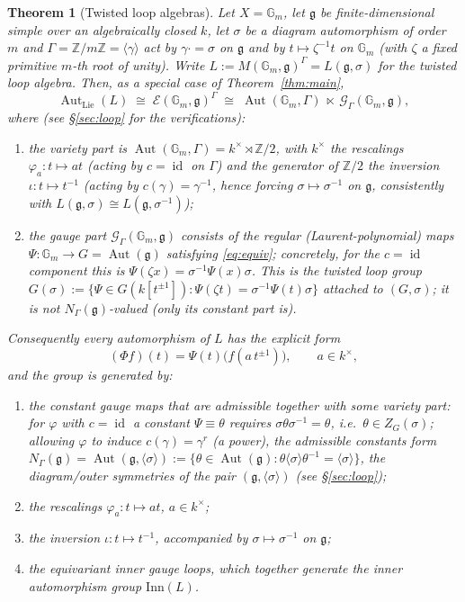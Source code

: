 \documentclass{amsart}
\newtheorem{theorem}{Theorem}
\theoremstyle{definition}
\DeclareMathOperator{\Aut}{Aut}
\DeclareMathOperator{\id}{id}
\newcommand{\Gm}{\mathbb{G}_m}
\newcommand{\g}{\mathfrak{g}}
\newcommand{\Z}{\mathbb{Z}}
\newcommand{\M}{M}
\begin{document}
\begin{theorem}[Twisted loop algebras]\label{thm:loop}
Let $X=\Gm$, let $\g$ be finite-dimensional simple over an algebraically
closed $k$, let $\sigma$ be a diagram automorphism of order $m$ and
$\Gamma=\Z/m\Z=\langle\gamma\rangle$ act by $\gamma\cdot=\sigma$ on $\g$ and
by $t\mapsto\zeta^{-1}t$ on $\Gm$ (with $\zeta$ a fixed primitive $m$-th root
of unity).  Write $L:=\M(\Gm,\g)^\Gamma=L(\g,\sigma)$ for the twisted loop
algebra.  Then, as a special case of Theorem~\ref{thm:main},
\[
\Aut_{\mathrm{Lie}}(L)\;\cong\;\mathcal E(\Gm,\g)^\Gamma
\;\cong\;
\Aut(\Gm,\Gamma)\ \ltimes\ \mathcal G_\Gamma(\Gm,\g),
\]
where (see \S\ref{sec:loop} for the verifications):
\begin{enumerate}
\item the variety part is
$\Aut(\Gm,\Gamma)=k^\times\rtimes\Z/2$, with $k^\times$ the rescalings
$\varphi_a\colon t\mapsto at$ (acting by $c=\id$ on $\Gamma$) and the
generator of $\Z/2$ the inversion $\iota\colon t\mapsto t^{-1}$ (acting by
$c(\gamma)=\gamma^{-1}$, hence forcing $\sigma\mapsto\sigma^{-1}$ on
$\g$, consistently with $L(\g,\sigma)\cong L(\g,\sigma^{-1})$);
\item the gauge part $\mathcal G_\Gamma(\Gm,\g)$ consists of
the regular (Laurent-polynomial) maps $\Psi\colon\Gm\to G=\Aut(\g)$
satisfying \eqref{eq:equiv}; concretely, for the $c=\id$ component this is
$\Psi(\zeta x)=\sigma^{-1}\Psi(x)\sigma$.  This is the \emph{twisted loop
group} $G(\sigma):=\{\Psi\in G(k[t^{\pm1}]):\Psi(\zeta t)=
\sigma^{-1}\Psi(t)\sigma\}$ attached to $(G,\sigma)$; it is \emph{not}
$N_\Gamma(\g)$-valued (only its constant part is).
\end{enumerate}
Consequently every automorphism of $L$ has the explicit form
\begin{equation}\label{eq:loopaut}
(\Phi f)(t)=\Psi(t)\bigl(f(a\,t^{\pm1})\bigr),\qquad a\in k^\times,
\end{equation}
and the group is generated by:
\begin{enumerate}
\item the constant gauge maps that are admissible together with some
variety part: for $\varphi$ with $c=\id$ a constant $\Psi\equiv\theta$
requires $\sigma\theta\sigma^{-1}=\theta$, i.e.\ $\theta\in Z_G(\sigma)$;
allowing $\varphi$ to induce $c(\gamma)=\gamma^{r}$ (a power), the
admissible constants form $N_\Gamma(\g)=\Aut(\g,\langle\sigma\rangle):=
\{\theta\in\Aut(\g):\theta\langle\sigma\rangle\theta^{-1}=
\langle\sigma\rangle\}$, the diagram/outer symmetries of the pair
$(\g,\langle\sigma\rangle)$ (see \S\ref{sec:loop});
\item the rescalings $\varphi_a\colon t\mapsto a t$, $a\in k^\times$;
\item the inversion $\iota\colon t\mapsto t^{-1}$, accompanied by
$\sigma\mapsto\sigma^{-1}$ on $\g$;
\item the equivariant inner gauge loops, which together generate the inner
automorphism group $\mathrm{Inn}(L)$.
\end{enumerate}
\end{theorem}
\end{document}
